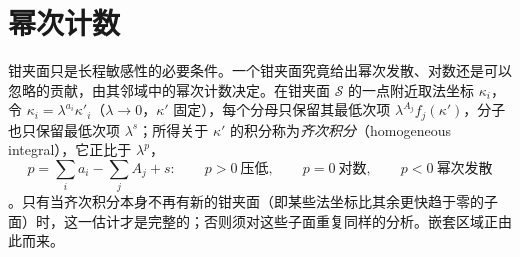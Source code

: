 \section{幂次计数}\label{sec:ir-power}

钳夹面只是长程敏感性的必要条件。一个钳夹面究竟给出幂次发散、对数还是可以忽略的贡献，由其邻域中的幂次计数决定\cite[第~2.3~节]{Sterman:1995fz}。在钳夹面 $\mathcal S$ 的一点附近取法坐标 $\kappa_i$，令 $\kappa_i=\lambda^{a_i}\kappa'_i$（$\lambda\to0$，$\kappa'$ 固定），每个分母只保留其最低次项 $\lambda^{A_j}f_j(\kappa')$，分子也只保留最低次项 $\lambda^{s}$；所得关于 $\kappa'$ 的积分称为\emph{齐次积分}（homogeneous integral），它正比于 $\lambda^{p}$，
\begin{equation}\label{eq:ir-pgeneric}
p=\sum_ia_i-\sum_jA_j+s :\qquad p>0\ \text{压低},\qquad p=0\ \text{对数},\qquad p<0\ \text{幂次发散}
\end{equation}
\cite[式~(60)--(62)]{Sterman:1995fz}。只有当齐次积分本身不再有新的钳夹面（即某些法坐标比其余更快趋于零的子面）时，这一估计才是完整的；否则须对这些子面重复同样的分析。嵌套区域正由此而来。

